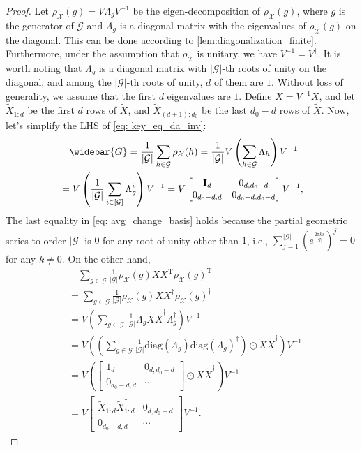 \documentclass{article}
\newcommand{\T}{\mathrm{T}}
\newcommand{\G}{\mathcal{G}}
\newcommand{\X}{\mathcal{X}}
\theoremstyle{plain}
\theoremstyle{definition}
\theoremstyle{remark}
\theoremstyle{remark}
\begin{document}
\begin{proof}
    Let $\rho_{\X}(g) = V \Lambda_g V^{-1}$ be the eigen-decomposition of $\rho_{\X}(g)$, where $g$ is the generator of $\G$ and $\Lambda_g$ is a diagonal matrix with the eigenvalues of $\rho_{\X}(g)$ on the diagonal. This can be done according to \autoref{lem:diagonalization_finite}. Furthermore, under the assumption that $\rho_{\X}$ is unitary, we have $V^{-1} = V^{\dagger}$.
    It is worth noting that $\Lambda_g$ is a diagonal matrix with $|\G|$-th roots of unity on the diagonal, and among the $|\G|$-th roots of unity, $d$ of them are $1$. Without loss of generality, we assume that the first $d$ eigenvalues are $1$. Define $\widetilde{X} = V^{-1} X$, and let $\widetilde{X}_{1:d}$ be the first $d$ rows of $\widetilde{X}$, and $\widetilde{X}_{(d+1):d_0}$ be the last $d_0-d$ rows of $\widetilde{X}$. Now, let's simplify the LHS of \autoref{eq: key_eq_da_inv}:
    \begin{align} \label{eq: avg_change_basis}
      & \quad \widebar{G} = \frac{1}{|\G|} \sum_{h \in \mathcal{G}} \rho_{\X}(h) = \frac{1}{|\G|} V \left(\sum_{h \in \mathcal{G}} \Lambda_h\right) V^{-1} \nonumber \\
      &= V \left(\frac{1}{|\G|} \sum_{i \in [\mathcal{G}]} \Lambda_g^{i}\right) V^{-1} = V \begin{bmatrix} \mathbf{I}_d & 0_{d, d_0-d} \\ 0_{d_0-d, d} & 0_{d_0-d, d_0-d} \end{bmatrix} V^{-1},
    \end{align}
    The last equality in \autoref{eq: avg_change_basis} holds because the partial geometric series to order $|\G|$ is $0$ for any root of unity other than $1$, i.e., $\sum_{j=1}^{|\G|} (e^{\frac{2\pi k i}{|\G|}})^{j} = 0$ for any $k \neq 0$. On the other hand,
    \begin{align}
      &\quad \sum_{g \in \G} \frac{1}{|\G|} \rho_{\mathcal{X}}(g)XX^{\T} {\rho_{\mathcal{X}}(g)}^{\T} \\
      &= \sum_{g \in \G} \frac{1}{|\G|} \rho_{\mathcal{X}}(g)XX^{\dagger} {\rho_{\mathcal{X}}(g)}^{\dagger} \nonumber \\
      &= V \left(\sum_{g \in \G} \frac{1}{|\G|} \Lambda_g \widetilde{X} \widetilde{X}^{\dagger} \Lambda_g^{\dagger}\right) V^{-1} \nonumber \\
      &= V \left(\left(\sum_{g \in \G}\frac{1}{|\G|} \text{diag}(\Lambda_g)\text{diag}(\Lambda_g)^{\dagger}\right)\odot \widetilde{X} \widetilde{X}^{\dagger}\right) V^{-1} \nonumber \\
      &= V \left(\begin{bmatrix} 1_d & 0_{d, d_0-d} \\ 0_{d_0-d, d} & \cdots \end{bmatrix} \odot \widetilde{X} \widetilde{X}^{\dagger}\right) V^{-1} \nonumber \\
      &= V \begin{bmatrix} \widetilde{X}_{1:d} \widetilde{X}_{1:d}^{\dagger} & 0_{d, d_0-d} \\ 0_{d_0-d, d} & \cdots \end{bmatrix} V^{-1}.
    \end{align}


\end{proof}
\end{document}

